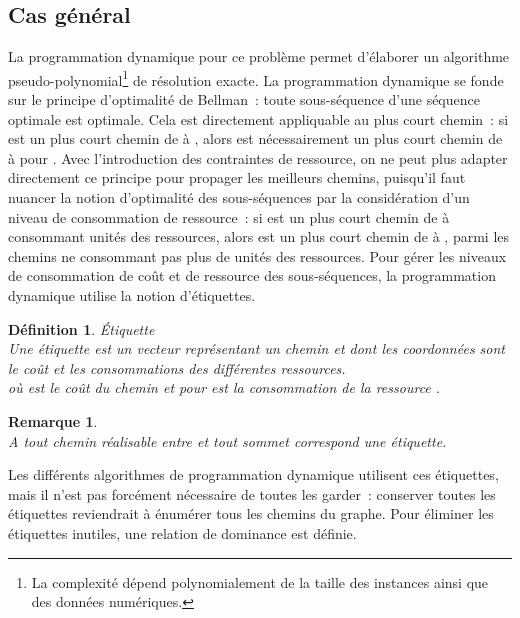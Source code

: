 \documentclass[10pt,francais]{llncs}
\newtheorem{rem}{Remarque}
\newtheorem{defs}{D\'efinition}
\begin{document}
\subsection{Cas g\'en\'eral}\label{sub-resol-progdyn}
La programmation dynamique pour ce probl\`eme permet d'\'elaborer un algorithme pseudo-polynomial\footnote{La complexit\'e d\'epend polynomialement de la taille des instances ainsi que des donn\'ees num\'eriques.} de r\'esolution exacte. La programmation dynamique se fonde sur le principe d'optimalit\'e de Bellman~: toute sous-s\'equence d'une s\'equence optimale est optimale. Cela est directement appliquable au plus court chemin~: si  est un plus court chemin de  \`a , alors  est n\'ecessairement un plus court chemin de  \`a  pour .  Avec l'introduction des contraintes de ressource, on ne peut plus adapter directement ce principe pour propager les meilleurs chemins, puisqu'il faut nuancer la notion d'optimalit\'e des sous-s\'equences par la consid\'eration d'un niveau de consommation de ressource~: si  est un plus court chemin de  \`a  consommant  unit\'es des  ressources, alors   est un plus court chemin de  \`a , parmi les chemins ne consommant pas plus de  unit\'es des ressources. Pour g\'erer les niveaux de consommation de co\^ut et de ressource des sous-s\'equences, la programmation dynamique utilise la notion d'\'etiquettes.
\begin{defs}
\'Etiquette\\
Une \'etiquette est un vecteur repr\'esentant un chemin et dont les coordonn\'ees sont le co\^ut et les consommations des diff\'erentes ressources.\\
 o\`u  est le co\^ut du chemin et  pour  est la consommation de la ressource . 
\end{defs}
\begin{rem}
~\\
A tout chemin r\'ealisable entre  et tout sommet correspond une \'etiquette.
\end{rem}
Les diff\'erents algorithmes de programmation dynamique utilisent ces \'etiquettes, mais il n'est pas forc\'ement n\'ecessaire de toutes les garder~: conserver toutes les \'etiquettes reviendrait \`a \'enum\'erer tous les chemins du graphe. Pour \'eliminer les \'etiquettes inutiles, une relation de dominance est d\'efinie.
\end{document}
